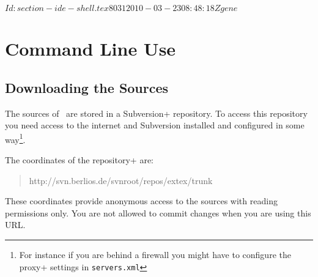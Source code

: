 \SVN$Id: section-ide-shell.tex 8031 2010-03-23 08:48:18Z gene $

\section{Command Line Use}

\subsection{Downloading the Sources}

The sources of \ExTeX\ are stored in a \+Subversion+ repository. To
access this repository you need access to the internet and Subversion
installed and configured in some way\footnote{For instance if you are
  behind a firewall you might have to configure the \+proxy+ settings
  in \texttt{servers.xml}}.

The coordinates of the \+repository+ are:

\begin{quotation}
  http://svn.berlios.de/svnroot/repos/extex/trunk
\end{quotation}

These coordinates provide anonymous access to the sources with reading
permissions only. You are not allowed to commit changes when you are
using this URL.

